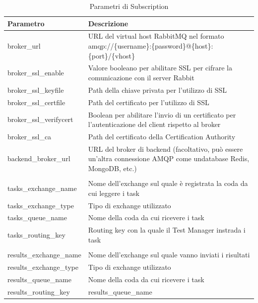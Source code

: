 \documentclass[../main.tex]{subfiles}
\begin{document}
\begin{table}[h]
\centering
\begin{tabular}{| m{4.4cm}| m{9cm} | }
\hline
\textbf{Parametro} & \textbf{Descrizione} \\ \hline
broker\_url & URL del virtual host RabbitMQ nel formato \newline amqp://\{username\}:\{password\}@\{host\}:\{port\}/\newline\{vhost\} \\ \hline
broker\_ssl\_enable & Valore booleano per abilitare SSL per cifrare la comunicazione con il server Rabbit \\ \hline
broker\_ssl\_keyfile & Path della chiave privata per l'utilizzo di SSL \\ \hline
broker\_ssl\_certfile & Path del certificato per l'utilizzo di SSL \\ \hline
broker\_ssl\_verifycert & Boolean per abilitare l'invio di un certificato per l'autenticazione del client rispetto al broker \\ \hline
broker\_ssl\_ca & Path del certificato della Certification Authority \\ \hline
backend\_broker\_url & URL del broker di backend (facoltativo, può \newline essere un'altra connessione AMQP come un\newline database Redis, MongoDB, etc.) \\ \hline
 &  \\ \hline
tasks\_exchange\_name & Nome dell'exchange sul quale è registrata la coda da cui leggere i task \\ \hline
tasks\_exchange\_type & Tipo di exchange utilizzato \\ \hline
tasks\_queue\_name & Nome della coda da cui ricevere i task \\ \hline
tasks\_routing\_key & Routing key con la quale il Test Manager instrada i task \\ \hline
 &  \\ \hline
results\_exchange\_name & Nome dell'exchange sul quale vanno inviati i risultati \\ \hline
results\_exchange\_type & Tipo di exchange utilizzato \\ \hline
results\_queue\_name & Nome della coda da cui ricevere i task \\ \hline
results\_routing\_key & results\_queue\_name \\ \hline
\end{tabular}
\caption{Parametri di Subscription}
\label{tab:subscription_parameters}
\end{table}
\end{document}

